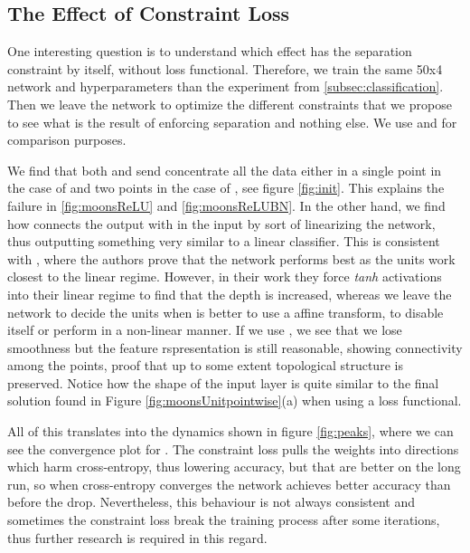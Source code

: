 \subsection{The Effect of Constraint Loss}\label{subsec:effectConstraintLoss}

One interesting question is to understand which effect has the separation constraint by itself, without loss functional. Therefore, we train the same 50x4 network and hyperparameters than the experiment from \ref{subsec:classification}. Then we leave the network to optimize the different constraints that we propose to see what is the result of enforcing separation and nothing else. We use \ReLU and \ReLUBN for comparison purposes. 

We find that both \ReLU and \ReLUBN send concentrate all the data either in a single point in the case of \ReLU and two points in the case of \ReLUBN, see figure \ref{fig:init}. This explains the failure in \ref{fig:moonsReLU} and \ref{fig:moonsReLUBN}. In the other hand, we find how \SepLayer connects the output with in the input by sort of linearizing the network, thus outputting something very similar to a linear classifier. This is consistent with \cite{batchnormGradientExplosion}, where the authors prove that the network performs best as the units work closest to the linear regime. However, in their work they force \emph{tanh} activations into their linear regime to find that the depth is increased, whereas we leave the network to decide the units when is better to use a affine transform, to disable itself or perform in a non-linear manner. If we use \SepUnitPoint, we see that we lose smoothness but the feature rspresentation is still reasonable, showing connectivity among the points, proof that up to some extent topological structure is preserved. Notice how the shape of the input layer is quite similar to the final solution found in Figure \ref{fig:moonsUnitpointwise}(a) when using a loss functional. 

All of this translates into the dynamics shown in figure \ref{fig:peaks}, where we can see the convergence plot for \SepUnitPoint. The constraint loss pulls the weights into directions which harm cross-entropy, thus lowering accuracy, but that are better on the long run, so when cross-entropy converges the network achieves better accuracy than before the drop. Nevertheless, this behaviour is not always consistent and sometimes the constraint loss break the training process after some iterations, thus further research is required in this regard.

